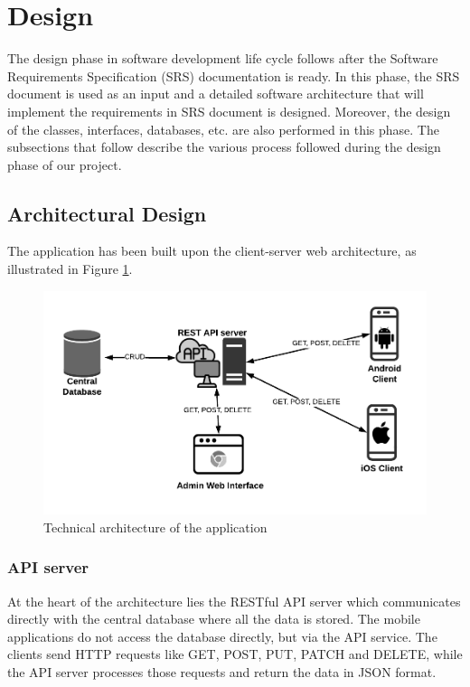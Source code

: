 \documentclass[12pt, a4paper, oneside]{article}
\begin{document}
\pagebreak
\section{Design}
The design phase in software development life cycle follows after the Software Requirements Specification (SRS) documentation is ready. In this phase, the SRS document is used as an input and a detailed software architecture that will implement the requirements in SRS document is designed. Moreover, the design of the classes, interfaces, databases, etc. are also performed in this phase. The subsections that follow describe the various process followed during the design phase of our project.

\subsection{Architectural Design}
The application has been built upon the client-server web architecture, as illustrated in Figure \ref{fig:arch}.

\begin{figure}[H]
\includegraphics[width=\linewidth]{architecture}
\centering
\caption{Technical architecture of the application}
\label{fig:arch}
\end{figure}

\subsubsection{API server}
At the heart of the architecture lies the RESTful API server which communicates directly with the central database where all the data is stored. The mobile applications do not access the database directly, but via the API service. The clients send HTTP requests like GET, POST, PUT, PATCH and DELETE, while the API server processes those requests and return the data in JSON format.
\end{document}
